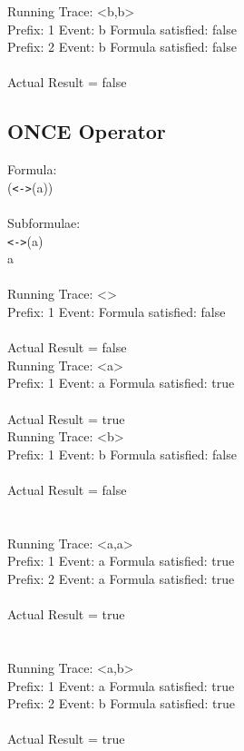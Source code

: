 \noindent Running Trace: \textless b,b\textgreater\\
  Prefix: 1 Event: b Formula satisfied: false\\
  Prefix: 2 Event: b Formula satisfied: false\\
\\
Actual Result = false\\

\subsection{ONCE Operator}

Formula:\\
(\texttt{\textless -\textgreater}(a))\\
\\
Subformulae:\\
\texttt{\textless -\textgreater}(a)\\
a\\
\\
Running Trace: \textless \textgreater\\
  Prefix: 1 Event:  Formula satisfied: false\\
\\
Actual Result = false\\

\noindent Running Trace: \textless a\textgreater\\
  Prefix: 1 Event: a Formula satisfied: true\\
\\
Actual Result = true\\

\noindent Running Trace: \textless b\textgreater\\
  Prefix: 1 Event: b Formula satisfied: false\\
\\
Actual Result = false\\
\\
\\
Running Trace: \textless a,a\textgreater\\
  Prefix: 1 Event: a Formula satisfied: true\\
  Prefix: 2 Event: a Formula satisfied: true\\
\\
Actual Result = true\\
\\
\\
Running Trace: \textless a,b\textgreater\\
  Prefix: 1 Event: a Formula satisfied: true\\
  Prefix: 2 Event: b Formula satisfied: true\\
\\
Actual Result = true\\
\\
\\
\newpage


